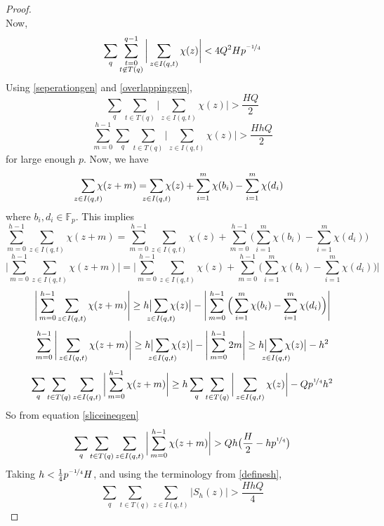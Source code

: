 \documentclass{report}
\begin{document}
\begin{proof}
\begin{equation}
\end{equation}
Now,
\begin{equation} \label{overlappinggen}
\sum_q\sum\limits_{\substack{t=0\\t\not \in T(q)}}^{q-1}\bigg\lvert\sum\limits_{z\in I(q,t) }\chi(z)\bigg \rvert < 4Q^2 Hp^{\nicefrac{-1}{4}}
\end{equation}
Using \ref{seperationgen} and \ref{overlappinggen},
$$\sum_q\sum\limits_{t\in T(q)}\bigg \lvert\sum\limits_{z\in I(q,t)}\chi(z)\bigg \rvert >\frac{HQ}{2}$$
\begin{equation}
\sum\limits_{m=0}^{h-1}\sum_q\sum\limits_{t\in T(q)}\bigg \lvert\sum\limits_{z\in I(q,t)}\chi(z)\bigg \rvert > \frac{HhQ}{2}
\end{equation} \label{sliceineqgen}
for large enough $p$. Now, we have
$$\sum\limits_{\mathclap {z\in I(q,t)}}\chi(z+m)= \sum\limits_{\mathclap{z\in I(q,t)}}\chi(z) + \sum\limits_{i=1}^m\chi(b_i)-\sum\limits_{i=1}^m\chi(d_i)$$
where $b_i,d_i\in\mathbb{F}_p$. This implies
$$\sum\limits_{m=0}^{h-1}\sum\limits_{z\in I(q,t)}\chi(z+m)= \sum\limits_{m=0}^{h-1}\sum\limits_{z\in I(q,t)}\chi(z) + \sum\limits_{m=0}^{h-1}\Big(\sum\limits_{i=1}^m\chi(b_i)-\sum\limits_{i=1}^m\chi(d_i)\Big)$$
$$\Bigg\lvert\sum\limits_{m=0}^{h-1}\sum\limits_{z\in I(q,t)}\chi(z+m)\Bigg\rvert= \Bigg\lvert\sum\limits_{m=0}^{h-1} \sum\limits_{z\in I(q,t)}\chi(z) + \sum\limits_{m=0}^{h-1}\Big(\sum\limits_{i=1}^m\chi(b_i)-\sum\limits_{i=1}^m \chi(d_i)\Big)\Bigg\rvert$$
$$\Bigg\lvert\sum\limits_{m=0}^{h-1}\sum\limits_{z\in I(q,t)}\chi(z+m)\Bigg\rvert \geq h\big\lvert\sum\limits_{\mathclap{ z\in I(q,t)}}\chi(z)\big\rvert -\Bigg\lvert\sum\limits_{m=0}^{h-1}\Big(\sum\limits_{i=1}^m\chi(b_i)-\sum\limits_{i=1}^m \chi(d_i)\Big)\Bigg\rvert$$
$$\sum\limits_{m=0}^{h-1}\Bigg\lvert\sum\limits_{z\in I(q,t)}\chi(z+m)\Bigg\rvert \geq h\big\lvert\sum\limits_{\mathclap{ z\in I(q,t)}}\chi(z)\big\rvert -\Bigg\lvert\sum\limits_{m=0}^{h-1}2m\Bigg\rvert \geq h\big\lvert\sum\limits_{\mathclap{z\in I(q,t)}}\chi(z)\big\rvert -h^2$$
$$\sum_q\sum\limits_{t\in T(q)}\sum\limits_{z\in I(q,t)}\bigg \lvert \sum\limits_{m=0}^{h-1}\chi(z+m) \bigg \rvert \geq h\sum_q\sum\limits_{t\in T(q)}\bigg \lvert \sum\limits_{z\in I(q,t)}\chi(z)\bigg \rvert-Qp^{\nicefrac{1}{4}}h^2$$
So from equation \ref{sliceineqgen}
$$\sum_q\sum\limits_{t\in T(q)}\sum\limits_{z\in I(q,t)}\bigg \lvert \sum\limits_{m=0}^{h-1}\chi(z+m) \bigg \rvert > Qh\big(\frac{H}{2}-hp^{\nicefrac{1}{4}}\big)$$
Taking $h<\frac{1}{4}p^{\nicefrac{-1}{4}}H$, and using the terminology from \ref{definesh},
$$\sum_q\sum\limits_{t\in T(q)}\sum\limits_{z\in I(q,t)}\lvert S_h(z) \rvert > \frac{HhQ}{4}$$

\end{proof}
\end{document}
